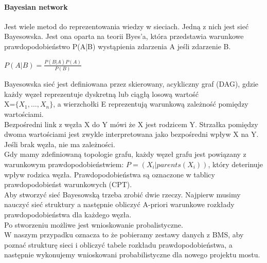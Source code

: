 \documentclass[11pt,a4paper]{article}
\begin{document}
\paragraph{Bayesian network}
Jest wiele metod do reprezentowania wiedzy w sieciach. Jedną z nich jest sieć Bayesowska. Jest ona oparta na teorii Byes'a, która przedstawia warunkowe prawdopodobieństwo P(A|B) wystąpienia zdarzenia A jeśli zdarzenie B.\\
\begin{center}
$P(A|B)=\frac{P(B|A)P(A)}{P(B)}$
\end{center}
Bayesowska sieć jest definiowana przez skierowany, acykliczny graf (DAG), gdzie każdy węzeł reprezentuje dyskretną lub ciągłą 
losową wartość \\
X=$\lbrace{X}_{1}, \ldots, {X}_{n}\rbrace$, a wierzchołki E reprezentują warunkową zależność pomiędzy wartościami.\\
Bezpośredni link z węzła X do Y mówi że X jest rodzicem Y. Strzałka pomiędzy dwoma wartościami jest zwykle interpretowana jako bezpośredni wpływ X na Y. Jeśli brak węzła, nie ma zależności. \\
Gdy mamy zdefiniowaną topologie grafu, każdy węzeł grafu jest powiązany z warunkowym prawdopodobieństwiem: $P = ({X}_{i}|parents({X}_{i}))$, który deterinuje wpływ rodzica węzła. Prawdopodobieństwa są oznaczone w tablicy prawdopodobieńst warunkowych (CPT). \\
Aby stworzyć sieć Bayesowską trzeba zrobić dwie rzeczy. Najpierw musimy nauczyć sieć struktury a następnie obliczyć A-priori warunkowe rozkłady prawdopodobieństwa dla każdego węzła.\\
Po stworzeniu możliwe jest wnioskowanie probalistyczne.\\
W naszym przypadku oznacza to że pobieramy zestawy danych z BMS, aby poznać strukturę sieci i obliczyć
tabele rozkładu prawdopodobieństwa, a następnie wykonujemy wnioskowani probabilistyczne dla nowego projektu mostu.
\end{document}
